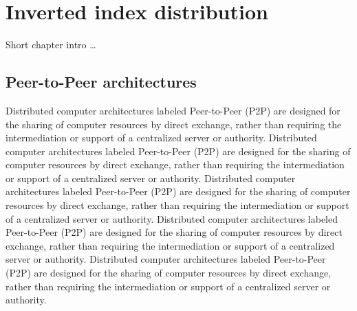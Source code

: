 \chapter{Inverted index distribution}

Short chapter intro \ldots

\section{Peer-to-Peer architectures}
Distributed computer architectures labeled Peer-to-Peer (P2P) are designed for the sharing of computer resources by direct exchange, rather than requiring the intermediation or support of a centralized server or authority. Distributed computer architectures labeled Peer-to-Peer (P2P) are designed for the sharing of computer resources by direct exchange, rather than requiring the intermediation or support of a centralized server or authority. Distributed computer architectures labeled Peer-to-Peer (P2P) are designed for the sharing of computer resources by direct exchange, rather than requiring the intermediation or support of a centralized server or authority. Distributed computer architectures labeled Peer-to-Peer (P2P) are designed for the sharing of computer resources by direct exchange, rather than requiring the intermediation or support of a centralized server or authority. Distributed computer architectures labeled Peer-to-Peer (P2P) are designed for the sharing of computer resources by direct exchange, rather than requiring the intermediation or support of a centralized server or authority.



